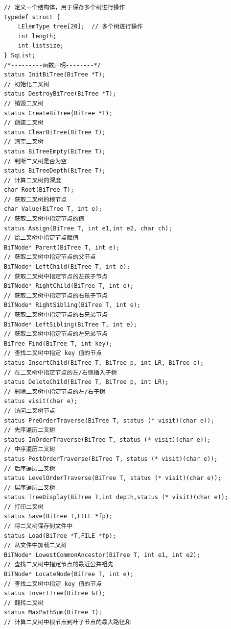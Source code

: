 \documentclass[supercite]{Experimental_Report}
\theoremstyle{definition}
\begin{document}
\begin{lstlisting}[title =相关定义,frame=none]
// 定义一个结构体，用于保存多个树进行操作
typedef struct {
	LElemType tree[20];  // 多个树进行操作
	int length;
	int listsize;
} SqList;
/*---------函数声明--------*/
status InitBiTree(BiTree *T);  
// 初始化二叉树
status DestroyBiTree(BiTree *T);  
// 销毁二叉树
status CreateBiTree(BiTree *T); 
// 创建二叉树
status ClearBiTree(BiTree T);  
// 清空二叉树
status BiTreeEmpty(BiTree T); 
// 判断二叉树是否为空
status BiTreeDepth(BiTree T); 
// 计算二叉树的深度
char Root(BiTree T); 
// 获取二叉树的根节点
char Value(BiTree T, int e);  
// 获取二叉树中指定节点的值
status Assign(BiTree T, int e1,int e2, char ch);  
// 给二叉树中指定节点赋值
BiTNode* Parent(BiTree T, int e);  
// 获取二叉树中指定节点的父节点
BiTNode* LeftChild(BiTree T, int e);  
// 获取二叉树中指定节点的左孩子节点
BiTNode* RightChild(BiTree T, int e);  
// 获取二叉树中指定节点的右孩子节点
BiTNode* RightSibling(BiTree T, int e);  
// 获取二叉树中指定节点的右兄弟节点
BiTNode* LeftSibling(BiTree T, int e);  
// 获取二叉树中指定节点的左兄弟节点
BiTree Find(BiTree T, int key);  
// 查找二叉树中指定 key 值的节点
status InsertChild(BiTree T, BiTree p, int LR, BiTree c);  
// 在二叉树中指定节点的左/右侧插入子树
status DeleteChild(BiTree T, BiTree p, int LR);  
// 删除二叉树中指定节点的左/右子树
status visit(char e);  
// 访问二叉树节点
status PreOrderTraverse(BiTree T, status (* visit)(char e)); 
// 先序遍历二叉树
status InOrderTraverse(BiTree T, status (* visit)(char e));  
// 中序遍历二叉树
status PostOrderTraverse(BiTree T, status (* visit)(char e));  
// 后序遍历二叉树
status LevelOrderTraverse(BiTree T, status (* visit)(char e));  
// 层序遍历二叉树
status TreeDisplay(BiTree T,int depth,status (* visit)(char e));  
// 打印二叉树
status Save(BiTree T,FILE *fp);  
// 将二叉树保存到文件中
status Load(BiTree *T,FILE *fp);  
// 从文件中加载二叉树
BiTNode* LowestCommonAncestor(BiTree T, int e1, int e2);  
// 查找二叉树中指定节点的最近公共祖先
BiTNode* LocateNode(BiTree T, int e);  
// 查找二叉树中指定 key 值的节点
status InvertTree(BiTree &T);  
// 翻转二叉树
status MaxPathSum(BiTree T);  
// 计算二叉树中根节点到叶子节点的最大路径和
\end{lstlisting}
\end{document}
